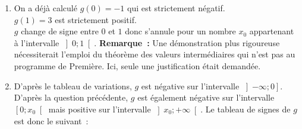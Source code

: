 \begin{corrige}
\begin{enumerate}
\begin{center}
          \end{center}
          \item
          On a déjà calculé $ g (0) = - 1 $ qui est strictement négatif. \\
          $ g (1) =3 $ est strictement positif.   \\
          $ g $ change de signe entre  $ 0 $  et  $ 1 $ donc s'annule pour un nombre $ x_{ 0 }  $ appartenant à l'intervalle  $  \left] 0 ; 1 \right[ . $
          \newpar
          \textbf{Remarque~: } Une démonstration plus rigoureuse nécessiterait l'emploi du théorème des valeurs intermédiaires qui n'est pas au programme de Première. Ici, seule une justification était demandée.
          \item
          D'après le tableau de variations, $ g $ est négative sur l'intervalle $  \left] -  \infty   ; 0 \right]  $. \\
          D'après la question précédente, $ g $ est également négative sur l'intervalle $  \left[ 0 ; x_{ 0 }  \right[  $ mais positive sur l'intervalle $  \left] x_{ 0 }  ; + \infty  \right[.$
          \newpar
          Le tableau de signes de $ g $ est donc le suivant~:  \\
          \begin{center}
               \begin{extern}%
\end{extern}
\end{center}
\end{enumerate}
\end{corrige}
